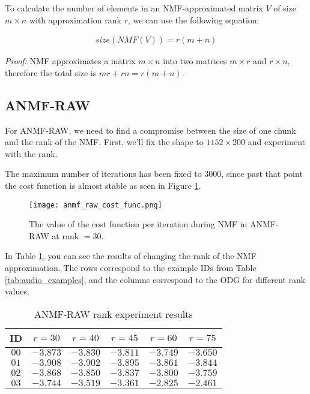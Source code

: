 To calculate the number of elements in an NMF-approximated matrix $V$ of size $m \times n$ with approximation rank $r$, we can use the following equation:

\begin{align}
\label{equ:nmf_size}
size(NMF(V)) = r(m+n)
\end{align}

\emph{Proof:} NMF approximates a matrix $m \times n$ into two matrices $m \times r$ and $r \times n$, therefore the total size is $mr + rn = r(m+n)$.

\subsection{ANMF-RAW}
For ANMF-RAW, we need to find a compromise between the size of one chunk and the rank of the NMF. First, we'll fix the shape to $1152 \times 200$ and experiment with the rank.

The maximum number of iterations has been fixed to 3000, since past that point the cost function is almost stable as seen in Figure \ref{fig:anmf_raw_cost_func}.

\begin{figure}[ht]
	\caption[ANMF-RAW cost function]{The value of the cost function per iteration during NMF in ANMF-RAW at rank $= 30$.}
	\label{fig:anmf_raw_cost_func}
	\centering
	\texttt{[image: anmf\_raw\_cost\_func.png]}
\end{figure}

In Table \ref{tab:anmf_raw_rank}, you can see the results of changing the rank of the NMF approximation. The rows correspond to the example IDs from Table \ref{tab:audio_examples}, and the columns correspond to the ODG for different rank values.

\begin{table}[htbp]\caption{ANMF-RAW rank experiment results}
	\label{tab:anmf_raw_rank}
	\centering
	\begin{tabular}{|c|c|c|c|c|c|}
		\hline
		ID & $r=30$ & $r=40$ & $r=45$ & $r=60$ & $r=75$ \\ \hline
		$00$ & $-3.873$ & $-3.830$ & $-3.811$ & $-3.749$ & $-3.650$ \\
		$01$ & $-3.908$ & $-3.902$ & $-3.895$ & $-3.861$ & $-3.844$ \\
		$02$ & $-3.868$ & $-3.850$ & $-3.837$ & $-3.800$ & $-3.759$ \\
		$03$ & $-3.744$ & $-3.519$ & $-3.361$ & $-2.825$ & $-2.461$ \\		
		\hline
	\end{tabular}
\end{table}

